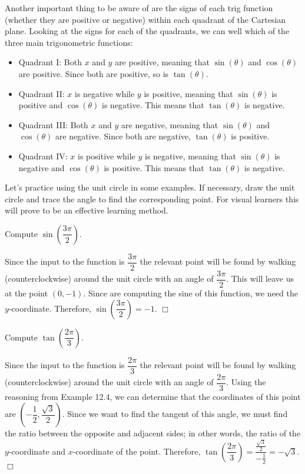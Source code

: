 \documentclass[lang=en,11pt]{elegantbook}
\begin{document}
Another important thing to be aware of are the signs of each trig function (whether they are positive or negative) within each quadrant of the Cartesian plane.  Looking at the signs for each of the quadrants, we can well which of the three main trigonometric functions:\begin{itemize}
    \item Quadrant I: Both $x$ and $y$ are positive, meaning that $\sin(\theta)$ and $\cos(\theta)$ are positive.  Since both are positive, so is $\tan(\theta)$.
    \item Quadrant II: $x$ is negative while $y$ is positive, meaning that $\sin(\theta)$ is positive and $\cos(\theta)$ is negative.  This means that $\tan(\theta)$ is negative.
    \item Quadrant III: Both $x$ and $y$ are negative, meaning that $\sin(\theta)$ and $\cos(\theta)$ are negative.  Since both are negative, $\tan(\theta)$ is positive.
    \item Quadrant IV: $x$ is positive while $y$ is negative, meaning that $\sin(\theta)$ is negative and $\cos(\theta)$ is positive.  This means that $\tan(\theta)$ is negative.
\end{itemize}
Let's practice using the unit circle in some examples.  If necessary, draw the unit circle and trace the angle to find the corresponding point.  For visual learners this will prove to be an effective learning method.
\begin{example}
Compute $\sin\left(\dfrac{3\pi}{2}\right)$.
\end{example}
\begin{solution}
Since the input to the function is $\dfrac{3\pi}{2}$ the relevant point will be found by walking (counterclockwise) around the unit circle with an angle of $\dfrac{3\pi}{2}$. This will leave us at the point $(0,-1)$. Since are computing the sine of this function, we need the $y$-coordinate. Therefore, $\sin\left(\dfrac{3\pi}{2}\right)=-1$. $\Box$
\end{solution}
\begin{example}
Compute $\tan\left(\dfrac{2\pi}{3}\right)$.
\end{example}
\begin{solution}
Since the input to the function is $\dfrac{2\pi}{3}$ the relevant point will be found by walking (counterclockwise) around the unit circle with an angle of $\dfrac{2\pi}{3}$. Using the reasoning from Example 12.4, we can determine that the coordinates of this point are $\left(-\dfrac{1}{2},\dfrac{\sqrt{3}}{2}\right)$. Since we want to find the tangent of this angle, we must find the ratio between the opposite and adjacent sides; in other words, the ratio of the $y$-coordinate and $x$-coordinate of the point. Therefore, $\tan\left(\dfrac{2\pi}{3}\right)=\dfrac{\frac{\sqrt{3}}{2}}{-\frac{1}{2}}=-\sqrt{3}.$ $\Box$
\end{solution}
\end{document}
